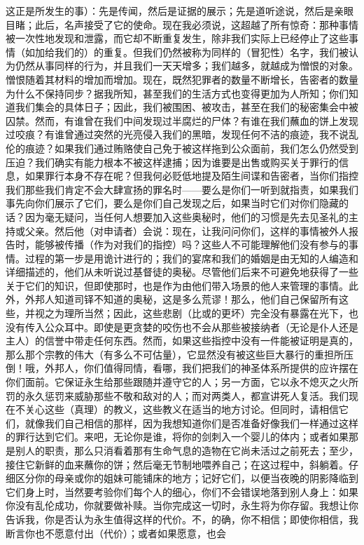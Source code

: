 这正是所发生的事）：先是传闻，然后是证据的展示；先是道听途说，然后是亲眼目睹；此后，名声接受了它的使命。现在我必须说，这超越了所有惊奇：那种事情被一次性地发现和泄露，而它却不断重复发生，除非我们实际上已经停止了这些事情（如加给我们的）的重复。但我们仍然被称为同样的（冒犯性）名字，我们被认为仍然从事同样的行为，并且我们一天天增多；我们越多，就越成为憎恨的对象。憎恨随着其材料的增加而增加。现在，既然犯罪者的数量不断增长，告密者的数量为什么不保持同步？据我所知，甚至我们的生活方式也变得更加为人所知；你们知道我们集会的具体日子；因此，我们被围困、被攻击，甚至在我们的秘密集会中被囚禁。然而，有谁曾在我们中间发现过半腐烂的尸体？有谁在我们蘸血的饼上发现过咬痕？有谁曾通过突然的光亮侵入我们的黑暗，发现任何不洁的痕迹，我不说乱伦的痕迹？如果我们通过贿赂使自己免于被这样拖到公众面前，我们怎么仍然受到压迫？我们确实有能力根本不被这样逮捕；因为谁要是出售或购买关于罪行的信息，如果罪行本身不存在呢？但我何必贬低地提及陌生间谍和告密者，当你们指控我们那些我们肯定不会大肆宣扬的罪名时——要么是你们一听到就指责，如果我们事先向你们展示了它们，要么是你们自己发现之后，如果当时它们对你们隐藏的话？因为毫无疑问，当任何人想要加入这些奥秘时，他们的习惯是先去见圣礼的主持或父亲。然后他（对申请者）会说：现在，让我问问你们，这样的事情被外人报告时，能够被传播（作为对我们的指控）吗？这些人不可能理解他们没有参与的事情。过程的第一步是用诡计进行的；我们的宴席和我们的婚姻是由无知的人编造和详细描述的，他们从未听说过基督徒的奥秘。尽管他们后来不可避免地获得了一些关于它们的知识，但即使那时，也是作为由他们带入场景的他人来管理的事情。此外，外邦人知道司铎不知道的奥秘，这是多么荒谬！那么，他们自己保留所有这些，并视之为理所当然；因此，这些悲剧（比或的更坏）完全没有暴露在光下，也没有传入公众耳中。即使是更贪婪的咬伤也不会从那些被接纳者（无论是仆人还是主人）的信誉中带走任何东西。然而，如果这些指控中没有一件能被证明是真的，那么那个宗教的伟大（有多么不可估量），它显然没有被这些巨大暴行的重担所压倒！哦，外邦人，你们值得同情，看哪，我们把我们的神圣体系所提供的应许摆在你们面前。它保证永生给那些跟随并遵守它的人；另一方面，它以永不熄灭之火所罚的永久惩罚来威胁那些不敬和敌对的人；而对两类人，都宣讲死人复活。我们现在不关心这些（真理）的教义，这些教义在适当的地方讨论。但同时，请相信它们，就像我们自己相信的那样，因为我想知道你们是否准备好像我们一样通过这样的罪行达到它们。来吧，无论你是谁，将你的剑刺入一个婴儿的体内；或者如果那是别人的职责，那么只消看着那有生命气息的造物在它尚未活过之前死去；至少，接住它新鲜的血来蘸你的饼；然后毫无节制地喂养自己；在这过程中，斜躺着。仔细区分你的母亲或你的姐妹可能铺床的地方；记好它们，以便当夜晚的阴影降临到它们身上时，当然要考验你们每个人的细心，你们不会错误地落到别人身上：如果你没有乱伦成功，你就要做补赎。当你完成这一切时，永生将为你存留。我想让你告诉我，你是否认为永生值得这样的代价。不，的确，你不相信；即使你相信，我断言你也不愿意付出（代价）；或者如果愿意，也会